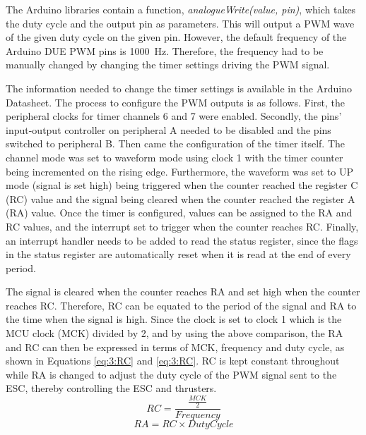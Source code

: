 	\vspace{0.4cm}
	The Arduino libraries contain a function, \textit{analogueWrite(value, pin)}, which takes the duty cycle and the output pin as parameters. This will output a PWM wave of the given duty cycle on the given pin. However, the default frequency of the Arduino DUE PWM pins is \SI{1000}{\hertz}. Therefore, the frequency had to be manually changed by changing the timer settings driving the PWM signal.\par
	\vspace{0.4cm}
	The information needed to change the timer settings is available in the Arduino Datasheet. The process to configure the PWM outputs is as follows. First, the peripheral clocks for timer channels 6 and 7 were enabled. Secondly, the pins' input-output controller on peripheral A needed to be disabled and the pins switched to peripheral B. Then came the configuration of the timer itself. The channel mode was set to waveform mode using clock 1 with the timer counter being incremented on the rising edge. Furthermore, the waveform was set to UP mode (signal is set high) being triggered when the counter reached the register C (RC) value and the signal being cleared when the counter reached the register A (RA) value. Once the timer is configured, values can be assigned to the RA and RC values, and the interrupt set to trigger when the counter reaches RC. Finally, an interrupt handler needs to be added to read the status register, since the flags in the status register are automatically reset when it is read at the end of every period.\par
	\vspace{0.4cm}
	The signal is cleared when the counter reaches RA and set high when the counter reaches RC. Therefore, RC can be equated to the period of the signal and RA to the time when the signal is high. Since the clock is set to clock 1 which is the MCU clock (MCK) divided by 2, and by using the above comparison, the RA and RC can then be expressed in terms of MCK, frequency and duty cycle, as shown in Equations \ref{eq:3:RC} and \ref{eq:3:RC}. RC is kept constant throughout while RA is changed to adjust the duty cycle of the PWM signal sent to the ESC, thereby controlling the ESC and thrusters.
	\begin{equation}
		RC = \frac{\frac{MCK}{2}}{Frequency}
		\label{eq:3:RC}
	\end{equation}
	\begin{equation}
		RA = RC \times Duty Cycle
		\label{eq:3:RA}
	\end{equation}
